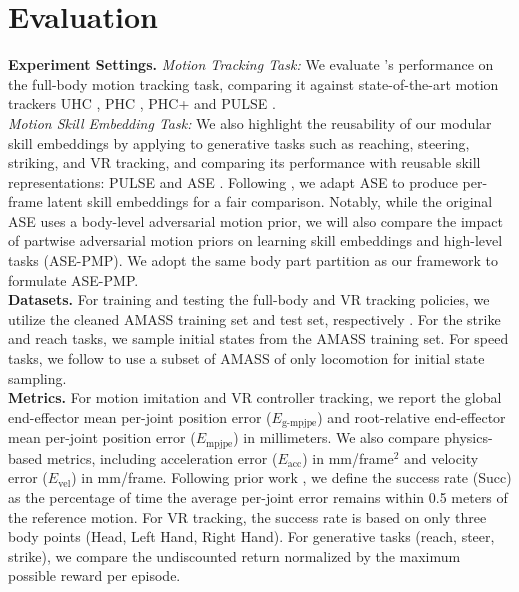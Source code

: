 \section{Evaluation}
\label{sec:eval}
\textbf{Experiment Settings.} \textit{Motion Tracking Task:} We evaluate \name's performance on the full-body motion tracking task, comparing it against state-of-the-art motion trackers UHC \cite{Luo2021DynamicsRegulatedKP}, PHC \cite{Luo2023PerpetualHC}, PHC+ and PULSE \cite{luo2024universal}. \\

\noindent \textit{Motion Skill Embedding Task:} We also highlight the reusability of our modular skill embeddings by applying \name to generative tasks such as reaching, steering, striking, and VR tracking, and comparing its performance with reusable skill representations: PULSE \cite{luo2024universal} and ASE \cite{2022-TOG-ASE}. Following \cite{luo2024universal}, we adapt ASE to produce per-frame latent skill embeddings for a fair comparison. Notably, while the original ASE uses a body-level adversarial motion prior, we will also compare the impact of partwise adversarial motion priors \cite{10.1145/3588432.3591487} on learning skill embeddings and high-level tasks (ASE-PMP). We adopt the same body part partition as our framework to formulate ASE-PMP.\\

\noindent \textbf{Datasets.} For training and testing the full-body and VR tracking policies, we utilize the cleaned AMASS training set and test set, respectively \cite{Luo2023PerpetualHC}. For the strike and reach tasks, we sample initial states from the AMASS training set. For speed tasks, we follow \cite{Wang2024PacerPlus} to use a subset of AMASS of only locomotion for initial state sampling.\\

\noindent \textbf{Metrics.} For motion imitation and VR controller tracking, we report the global end-effector mean per-joint position error ($E_{\text{g-mpjpe}}$) and root-relative end-effector mean per-joint position error ($E_{\text{mpjpe}}$) in millimeters. We also compare physics-based metrics, including acceleration error ($E_{\text{acc}}$) in mm/frame$^{2}$ and velocity error ($E_{\text{vel}}$) in mm/frame. Following prior work \cite{Luo2023PerpetualHC}, we define the success rate (Succ) as the percentage of time the average per-joint error remains within 0.5 meters of the reference motion. For VR tracking, the success rate is based on only three body points (Head, Left Hand, Right Hand). For generative tasks (reach, steer, strike), we compare the undiscounted return normalized by the maximum possible reward per episode. \\

